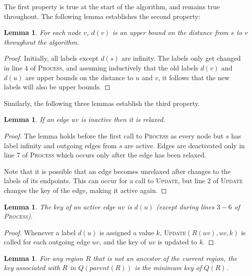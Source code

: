 \documentclass[12pt]{article}
\newtheorem{lemma}[theorem]{Lemma}
\begin{document}
The first property is true at the start of the algorithm, and remains true throughout. The following lemma establishes the second property:\\

\begin{lemma}
  For each node $v$, $d(v)$ is an upper bound on the distance from $s$ to $v$ throughout the algorithm.
\end{lemma}

\begin{proof}
  Initially, all labels except $d(s)$ are infinity. The labels only get changed in line $4$ of \textsc{Process}, and assuming inductively that the old labels $d(v)$ and $d(u)$ are upper bounds on the distance to $u$ and $v$, it follows that the new labels will also be upper bounds.
\end{proof}

Similarly, the following three lemmas establish the third property.\\

\begin{lemma}
  If an edge $uv$ is inactive then it is relaxed.
\end{lemma}

\begin{proof}
  The lemma holds before the first call to \textsc{Process} as every node but $s$ has label infinity and outgoing edges from $s$ are active. Edges are deactivated only in line $7$ of \textsc{Process} which occurs only after the edge has been relaxed.

  Note that it is possible that an edge becomes unrelaxed after changes to the labels of its endpoints. This can occur for a call to \textsc{Update}, but line $2$ of \textsc{Update} changes the key of the edge, making it active again.
\end{proof}

\begin{lemma}
  The key of an active edge $uv$ is $d(u)$ (except during lines $3-6$ of \textsc{Process}).
\end{lemma}

\begin{proof}
  Whenever a label $d(u)$ is assigned a value $k$, \textsc{Update}$(R(uv),uv,k)$ is called for each outgoing edge $uv$, and the key of $uv$ is updated to $k$.
\end{proof}

\begin{lemma}
  \label{lemma:invariant}
  For any region $R$ that is not an ancestor of the current region, the key associated with $R$ in $Q(parent(R))$ is the minimum key of $Q(R)$.
\end{lemma}
\end{document}
